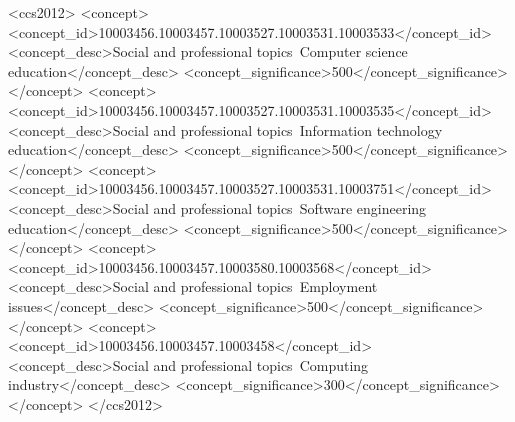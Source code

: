 \documentclass[sigconf,anonymous]{acmart}
\begin{document}
\begin{CCSXML}
<ccs2012>
<concept>
<concept_id>10003456.10003457.10003527.10003531.10003533</concept_id>
<concept_desc>Social and professional topics~Computer science education</concept_desc>
<concept_significance>500</concept_significance>
</concept>
<concept>
<concept_id>10003456.10003457.10003527.10003531.10003535</concept_id>
<concept_desc>Social and professional topics~Information technology education</concept_desc>
<concept_significance>500</concept_significance>
</concept>
<concept>
<concept_id>10003456.10003457.10003527.10003531.10003751</concept_id>
<concept_desc>Social and professional topics~Software engineering education</concept_desc>
<concept_significance>500</concept_significance>
</concept>
<concept>
<concept_id>10003456.10003457.10003580.10003568</concept_id>
<concept_desc>Social and professional topics~Employment issues</concept_desc>
<concept_significance>500</concept_significance>
</concept>
<concept>
<concept_id>10003456.10003457.10003458</concept_id>
<concept_desc>Social and professional topics~Computing industry</concept_desc>
<concept_significance>300</concept_significance>
</concept>
</ccs2012>
\end{CCSXML}



\maketitle

\end{document}
